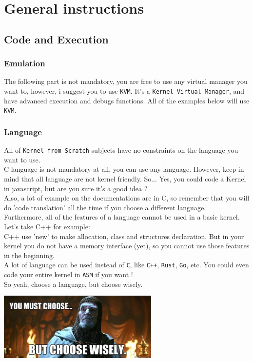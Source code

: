 \documentclass{42-en}
\begin{document}
\chapter{General instructions}

	\section{Code and Execution}
		\subsection{Emulation}
			The following part is not mandatory, you are free to use any virtual
			manager you want to, however, i suggest you to use \texttt{KVM}.
			It's a \texttt{Kernel Virtual Manager}, and have advanced execution
			and debugs functions.
			All of the examples below will use \texttt{KVM}.
		\subsection{Language}
			All of \texttt{Kernel from Scratch} subjects have no constraints on
			the language you want to use.\\ 
			C language is not mandatory at all, you can use any language. 
			However, keep in mind that all language are not kernel friendly.
			So... Yes, you could code a Kernel in javascript, but are you sure 
			it's a good idea ?\\
			Also, a lot of example on the documentations are in C, so remember 
			that you will do 'code translation' all the time if you choose a
			different language.\\
			Furthermore, all of the features of a language cannot be used in a
			basic kernel.\\
			Let's take C++ for example:\\
			C++ use 'new' to make allocation, class and structures declaration.
			But in your kernel you do not have a memory interface (yet), so you cannot
			use those features in the beginning.\\
			A lot of language can be used instead of \texttt{C}, like \texttt{C++},
			\texttt{Rust}, \texttt{Go}, etc.
			You could even code your entire kernel in \texttt{ASM} if you want !\\
			So yeah, choose a language, but choose wisely.\\
			\begin{center}
			  \includegraphics[width=8cm]{choose.jpg}
			\end{center}
\end{document}
